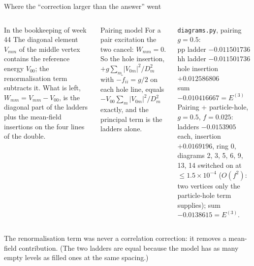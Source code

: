 \documentclass[aspectratio=169,10pt]{beamer}
\newcommand{\numbox}[1]{%
  \begin{tcolorbox}[colback=palegreen,colframe=teal!70!black,title={\bfseries Measured}]
  #1
  \end{tcolorbox}}
\newcommand{\ftil}[1]{\tilde f_{#1}}
\begin{document}
\begin{frame}[shrink=14]{Where the ``correction larger than the answer'' went}
\begin{columns}[T]
\begin{block}{In the bookkeeping of week 44}
The diagonal element \(V_{mm}\) of the middle vertex contains the reference energy \(V_{00}\); the renormalisation term subtracts it. What is left, \(W_{mm}=V_{mm}-V_{00}\), is the diagonal part of the ladders plus the mean-field insertions on the four lines of the double.
\end{block}
\begin{block}{Pairing model}
For a pair excitation the two cancel: \(W_{mm}=0\). So the hole insertion, \(+g\sum_m|V_{0m}|^2/D_m^2\) with \(-\ftil{ii}=g/2\) on each hole line, equals \(-V_{00}\sum_m|V_{0m}|^2/D_m^2\) exactly, and the principal term is the ladders alone.
\end{block}
\numbox{\texttt{diagrams.py}, pairing \(g=0.5\):\\
pp ladder \(-0.011501736\)\\
hh ladder \(-0.011501736\)\\
hole insertion \(+0.012586806\)\\
sum \(-0.010416667=E^{(3)}\)\\[0.3em]
Pairing + particle-hole, \(g=0.5\), \(f=0.025\): ladders \(-0.0153905\) each, insertion \(+0.0169196\), ring \(0\), diagrams 2, 3, 5, 6, 9, 13, 14 switched on at \(\le1.5\times10^{-4}\) (\(O(f^2)\): two vertices only the particle-hole term supplies); sum \(-0.0138615=E^{(3)}\).}
\end{columns}
\small The renormalisation term was never a correlation correction: it removes a mean-field contribution. (The two ladders are equal because the model has as many empty levels as filled ones at the same spacing.)
\end{frame}
\end{document}
